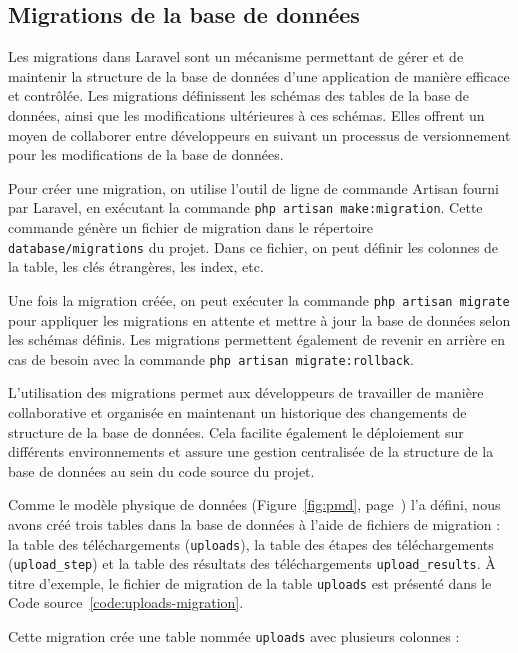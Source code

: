 \subsection{Migrations de la base de données}

Les migrations dans Laravel sont un mécanisme permettant de gérer et de maintenir la structure de la base de données d'une application de manière efficace et contrôlée. Les migrations définissent les schémas des tables de la base de données, ainsi que les modifications ultérieures à ces schémas. Elles offrent un moyen de collaborer entre développeurs en suivant un processus de versionnement pour les modifications de la base de données.

Pour créer une migration, on utilise l'outil de ligne de commande Artisan fourni par Laravel, en exécutant la commande \Verb|php artisan make:migration|. Cette commande génère un fichier de migration dans le répertoire \Verb|database/migrations| du projet. Dans ce fichier, on peut définir les colonnes de la table, les clés étrangères, les index, etc.

Une fois la migration créée, on peut exécuter la commande \Verb|php artisan migrate| pour appliquer les migrations en attente et mettre à jour la base de données selon les schémas définis. Les migrations permettent également de revenir en arrière en cas de besoin avec la commande \Verb|php artisan migrate:rollback|.

L'utilisation des migrations permet aux développeurs de travailler de manière collaborative et organisée en maintenant un historique des changements de structure de la base de données. Cela facilite également le déploiement sur différents environnements et assure une gestion centralisée de la structure de la base de données au sein du code source du projet.

Comme le modèle physique de données (Figure~\ref{fig:pmd}, page~\pageref{fig:pmd}) l'a défini, nous avons créé trois tables dans la base de données à l'aide de fichiers de migration : la table des téléchargements (\Verb|uploads|), la table des étapes des téléchargements (\Verb|upload_step|) et la table des résultats des téléchargements \Verb|upload_results|. À titre d'exemple, le fichier de migration de la table \Verb|uploads| est présenté dans le Code source~\ref{code:uploads-migration}.

Cette migration crée une table nommée \Verb|uploads| avec plusieurs colonnes :

